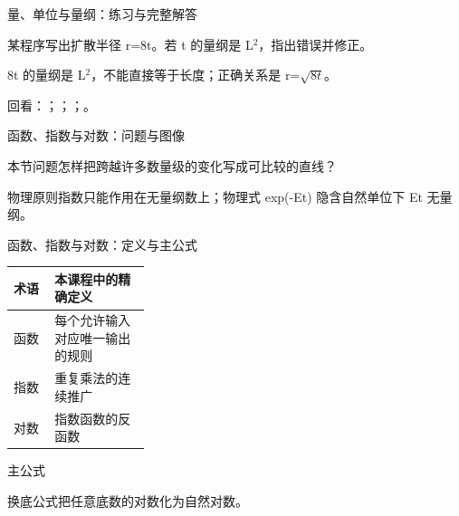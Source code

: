\begin{frame}[t]{量、单位与量纲：练习与完整解答}
\footnotesize
\begin{block}{}某程序写出扩散半径 r=8t。若 t 的量纲是 L\ensuremath{^{2}}，指出错误并修正。\end{block}
\begin{exampleblock}{}8t 的量纲是 L\ensuremath{^{2}}，不能直接等于长度；正确关系是 r=\ensuremath{\sqrt{8t}}。\end{exampleblock}
\vfill
\scriptsize 回看：；；；。
\end{frame}

\begin{frame}[t]{函数、指数与对数：问题与图像}
\footnotesize
\begin{block}{本节问题}怎样把跨越许多数量级的变化写成可比较的直线？\end{block}
\begin{block}{物理原则}\quad 指数只能作用在无量纲数上；物理式 exp(-Et) 隐含自然单位下 Et 无量纲。\end{block}
\end{frame}

\begin{frame}[t]{函数、指数与对数：定义与主公式}
\footnotesize\begin{tabularx}{\linewidth}{p{0.30\linewidth}Y}
\toprule 术语 & 本课程中的精确定义\\\midrule
{} 函数 & 每个允许输入对应唯一输出的规则\\
 指数 & 重复乘法的连续推广\\
 对数 & 指数函数的反函数\\
\bottomrule\end{tabularx}\vspace{0.15cm}
\begin{block}{ 主公式}\centering{}\end{block}
换底公式把任意底数的对数化为自然对数。
\end{frame}

